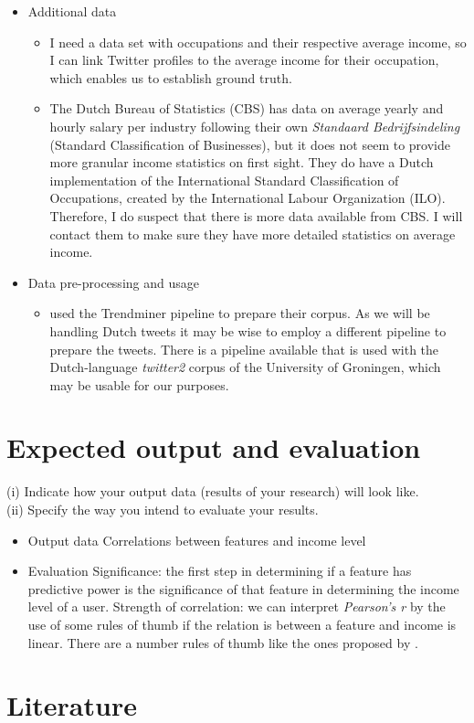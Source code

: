 \documentclass[11pt, a4paper]{article}
\begin{document}
\begin{itemize}
\item Additional data
\begin{itemize}
\item I need a data set with occupations and their respective average income, so I can link Twitter profiles to the average income for their occupation, which enables us to establish ground truth.
\item The Dutch Bureau of Statistics (CBS) has data on average yearly and hourly salary per industry following their own \textit{Standaard Bedrijfsindeling} (Standard Classification of Businesses), but it does not seem to provide more granular income statistics on first sight. They do have a Dutch implementation of the International Standard Classification of Occupations, created by the International Labour Organization (ILO). Therefore, I do suspect that there is more data available from CBS. I will contact them to make sure they have more detailed statistics on average income.
\end{itemize}

\item Data pre-processing and usage
\begin{itemize}
\item \cite{pietroA7} used the Trendminer pipeline to prepare their corpus. As we will be handling Dutch tweets it may be wise to employ a different pipeline to prepare the tweets. There is a pipeline available that is used with the Dutch-language \textit{twitter2} corpus of the University of Groningen, which may be usable for our purposes. 
\end{itemize}
\end{itemize}

\section{Expected output and evaluation}
(i) Indicate how your output data (results of your research) will look like.\\
(ii) Specify the way you intend to evaluate your results.
\begin{itemize}
\item Output data
\subitem Correlations between features and income level
\item Evaluation
\subitem Significance: the first step in determining if a feature has predictive power is the significance of that feature in determining the income level of a user.
\subitem Strength of correlation: we can interpret \textit{Pearson's r} by the use of some rules of thumb if the relation is between a feature and income is linear. There are a number  rules of thumb like the ones proposed by \cite{cohen1988statistical}. 
\end{itemize}

\section{Literature}

\end{document}
